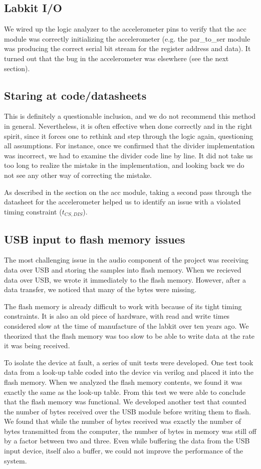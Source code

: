 \documentclass{article}
\begin{document}
\subsection{Labkit I/O}
We wired up the logic analyzer to the accelerometer pins to verify that the acc module was correctly initializing the accelerometer (e.g. the par\_to\_ser module was producing the correct serial bit stream for the register address and data).
It turned out that the bug in the accelerometer was elsewhere (see the next section).

\subsection{Staring at code/datasheets}
This is definitely a questionable inclusion, and we do not recommend this method in general.
Nevertheless, it is often effective when done correctly and in the right spirit,
since it forces one to rethink and step through the logic again, questioning all assumptions.
For instance, once we confirmed that the divider implementation was incorrect,
we had to examine the divider code line by line.
It did not take us too long to realize the mistake in the implementation,
and looking back we do not see any other way of correcting the mistake.

As described in the section on the acc module, taking a second pass through the datasheet for the accelerometer helped us to identify an issue with a violated timing constraint ($t_{CS,DIS}$).

\subsection{USB input to flash memory issues}
The most challenging issue in the audio component of the project was receiving data over USB and storing the samples into flash memory.
When we recieved data over USB, we wrote it immediately to the flash memory.
However, after a data transfer, we noticed that many of the bytes were missing.

The flash memory is already difficult to work with because of its tight timing constraints.
It is also an old piece of hardware, with read and write times considered slow at the time of manufacture of the labkit over ten years ago.
We theorized that the flash memory was too slow to be able to write data at the rate it was being received.

To isolate the device at fault, a series of unit tests were developed.
One test took data from a look-up table coded into the device via verilog and placed it into the flash memory.
When we analyzed the flash memory contents, we found it was exactly the same as the look-up table.
From this test we were able to conclude that the flash memory was functional.
We developed another test that counted the number of bytes received over the USB module before writing them to flash.
We found that while the number of bytes received was exactly the number of bytes transmitted from the computer,
the number of bytes in memory was still off by a factor between two and three.
Even while buffering the data from the USB input device, itself also a buffer, we could not improve the performance of the system.
\end{document}
